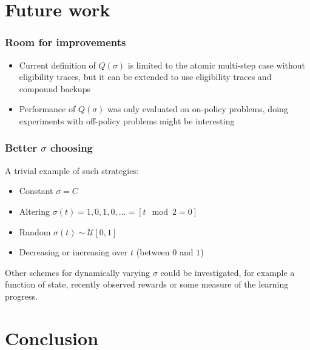 \documentclass{beamer}
\begin{document}
\section{Future work}

\begin{frame}
  \frametitle{Room for improvements}
  \begin{itemize}
    \item Current definition of $Q(\sigma)$ is limited to the atomic multi-step
      case without eligibility traces, but it can be extended to use
      eligibility traces and compound backups
    \item Performance of $Q(\sigma)$ was only evaluated on on-policy problems,
      doing experiments with off-policy problems might be interesting
  \end{itemize}
\end{frame}

\begin{frame}
  \frametitle{Better $\sigma$ choosing}
  A trivial example of such strategies:
  \begin{itemize}
    \item Constant $\sigma = C$
    \item Altering $\sigma(t) = 1, 0, 1, 0, \ldots = [t \mod 2 = 0]$
    \item Random $\sigma(t) \sim \mathcal{U}[0, 1]$
    \item Decreasing or increasing over $t$ (between $0$ and $1$)
  \end{itemize}
  Other schemes for dynamically varying $\sigma$ could be investigated, for
  example a function of state, recently observed rewards or some measure of the
  learning progress.
\end{frame}

\section{Conclusion}
\end{document}
